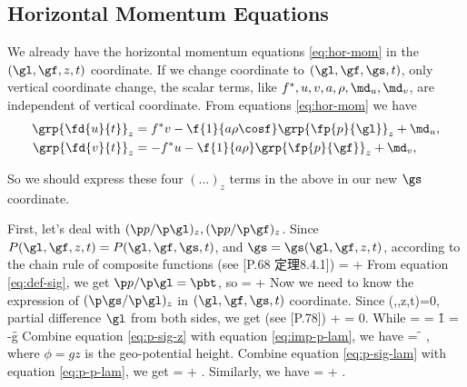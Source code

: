 \subsection{Horizontal Momentum Equations}
\label{der:hor-mom-sig}

We already have the horizontal momentum equations \ref{eq:hor-mom} in the $(\gl,
\gf, z, t)$ coordinate. If we change coordinate to $(\gl, \gf, \gs, t)$, only
vertical coordinate change, the scalar terms, like $f^*, u, v, a, \rho, \md_u,
\md_v$, are independent of vertical coordinate. From equations
\ref{eq:hor-mom} we have
\bese \label{eq:4}
\begin{align}
  \grp{ \fd{u}{t} }_z &= f^{*}v -\f{1}{a\rho\cosf} \grp{ \fp{p}{\gl} }_z +\md_u, \\
  \grp{ \fd{v}{t} }_z &=-f^{*}u-\f{1}{a\rho}       \grp{ \fp{p}{\gf} }_z +\md_v,
\end{align}
\ense

So we should express these four $(...)_z$ terms in the above in our new $\gs$
coordinate.

First, let's deal with $(\p p/\p \gl)_z, (\p p/\p \gf)_z$.
Since $P(\gl,\gf,z,t)=P(\gl,\gf,\gs,t)$, and $\gs=\gs(\gl,\gf,z,t)$, according
to the chain rule of composite functions (see \citet{Xie2004_book2}[P.68
定理8.4.1])
\beeq
{} =  +  \cooz{ \fp{\gs}{\gl} }
\eneq
From equation \ref{eq:def-sig}, we get $\p p/\p \gl = \pbt$, so
\beeq \label{eq:p-p-lam}
 =  + \pbt \cooz{ \fp{\gs}{\gl} }
\eneq
Now we need to know the expression of $(\p \gs/\p \gl)_z$ in $(\gl,\gf,\gs,t)$
coordinate. Since 
\beeq
\gs(\gl,\gf,z,t)=0, 
\eneq
partial difference $\gl$ from both sides, we get
(see \citet{Xie2004_book2}[P.78])
\beeq \label{eq:imp-p-lam}
\cooz{ \fp{\gs}{\gl} } +   = 0.
\eneq
While
\beeq
   =  
              = \f{1}{\pbt} 
              = -\f{\rho g}{\pbt} \label{eq:p-sig-z}
\eneq
Combine equation \ref{eq:p-sig-z} with equation \ref{eq:imp-p-lam}, we have
\beeq \label{eq:p-sig-lam}
  \cooz{ \fp{\gs}{\gl} } = \f{\rho}{\pbt} \coos{ \fp{\phi}{\gl} },
\eneq
where $\phi=gz$ is the geo-potential height.
Combine equation \ref{eq:p-sig-lam} with equation \ref{eq:p-p-lam}, we get
\beeq \label{eq:1}
 =  + \rho \coos{ \fp{\phi}{\gl} }.
\eneq
Similarly, we have
\beeq \label{eq:2}
 =  + \rho \coos{ \fp{\phi}{\gf} }.
\eneq


